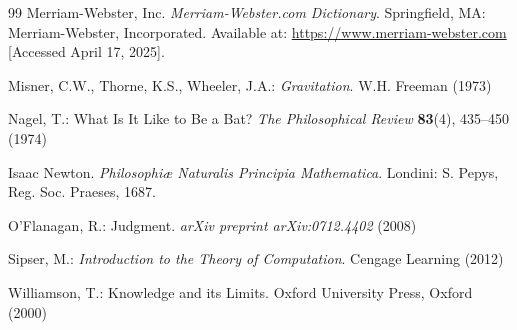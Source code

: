 \documentclass[runningheads]{llncs}
\begin{document}
\begin{thebibliography}{99}
Merriam-Webster, Inc. \emph{Merriam-Webster.com Dictionary}. Springfield, MA: Merriam-Webster, Incorporated. Available at: \url{https://www.merriam-webster.com} [Accessed April 17, 2025].

Misner, C.W., Thorne, K.S., Wheeler, J.A.: \textit{Gravitation}. W.H. Freeman (1973)

Nagel, T.: What Is It Like to Be a Bat? \textit{The Philosophical Review} \textbf{83}(4), 435--450 (1974)

Isaac Newton. \emph{Philosophiæ Naturalis Principia Mathematica}. Londini: S. Pepys, Reg. Soc. Praeses, 1687.

O'Flanagan, R.: Judgment. \textit{arXiv preprint arXiv:0712.4402} (2008)

Sipser, M.: \textit{Introduction to the Theory of Computation}. Cengage Learning (2012)

Williamson, T.: Knowledge and its Limits. Oxford University Press, Oxford (2000)
	
\end{thebibliography}
\end{document}
